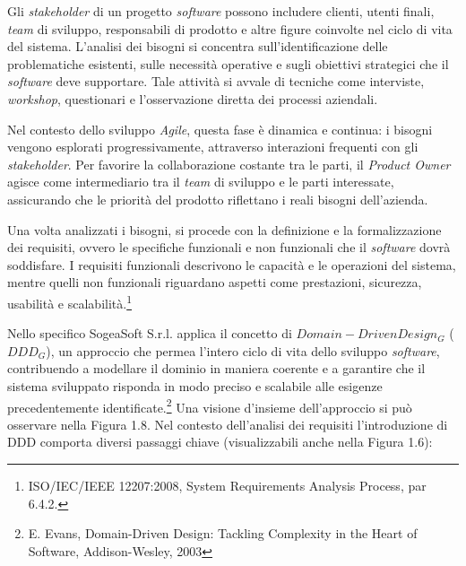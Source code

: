         \vspace{0.2 em}
        \noindent Gli \textit{stakeholder} di un progetto \textit{software} possono includere clienti, utenti finali, \textit{team} di sviluppo, responsabili di prodotto e altre figure coinvolte nel ciclo di vita del sistema. L’analisi dei bisogni si concentra sull’identificazione delle problematiche esistenti, sulle necessità operative e sugli obiettivi strategici che il \textit{software} deve supportare. Tale attività si avvale di tecniche come interviste, \textit{workshop}, questionari e l’osservazione diretta dei processi aziendali.

        \vspace{0.2 em}
        \noindent Nel contesto dello sviluppo \textit{Agile}, questa fase è dinamica e continua: i bisogni vengono esplorati progressivamente, attraverso interazioni frequenti con gli \textit{stakeholder}. Per favorire la collaborazione costante tra le parti, il \textit{Product Owner} agisce come intermediario tra il \textit{team} di sviluppo e le parti interessate, assicurando che le priorità del prodotto riflettano i reali bisogni dell’azienda.

        \vspace{0.2 em}
        \noindent Una volta analizzati i bisogni, si procede con la definizione e la formalizzazione dei requisiti, ovvero le specifiche funzionali e non funzionali che il \textit{software} dovrà soddisfare. I requisiti funzionali descrivono le capacità e le operazioni del sistema, mentre quelli non funzionali riguardano aspetti come prestazioni, sicurezza, usabilità e scalabilità.\footnote{ISO/IEC/IEEE 12207:2008, System Requirements Analysis Process, par 6.4.2.}

        \vspace{0.2 em}
        \noindent Nello specifico SogeaSoft S.r.l. applica il concetto di \textit{$Domain-Driven Design_G$} ($DDD_G$), un approccio che permea l’intero ciclo di vita dello sviluppo \textit{software}, contribuendo a modellare il dominio in maniera coerente e a garantire che il sistema sviluppato risponda in modo preciso e scalabile alle esigenze precedentemente identificate.\footnote{E. Evans, Domain-Driven Design: Tackling Complexity in the Heart of Software, Addison-Wesley, 2003} Una visione d'insieme dell'approccio si può osservare nella Figura 1.8.
        Nel contesto dell'analisi dei requisiti l'introduzione di DDD comporta diversi passaggi chiave (visualizzabili anche nella Figura 1.6):

